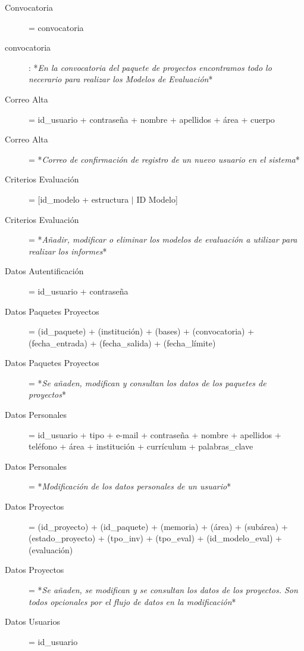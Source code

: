 \documentclass[12pt,a4paper,titlepage,spanish,twoside]{book}
\begin{document}
\begin{description}
\item[Convocatoria] = convocatoria

\item[convocatoria]: *\emph{En la convocatoria del paquete de proyectos
    encontramos todo lo necerario para realizar los Modelos de Evaluación}* 

\item[Correo Alta] = id\_usuario + contraseña + nombre + apellidos + área +
  cuerpo 

\item[Correo Alta] = *\emph{Correo de confirmación de registro de un nuevo
    usuario en el sistema}* 

\item[Criterios Evaluación] = [id\_modelo + estructura $\mid$ ID Modelo]

\item[Criterios Evaluación] = *\emph{Añadir, modificar o eliminar los modelos
    de e\-va\-lua\-ción a utilizar para realizar los informes}* 

\item[Datos Autentificación] = id\_usuario + contraseña

\item[Datos Paquetes Proyectos] = (id\_paquete) + (institución) + (bases) +
  (convocatoria) + (fecha\_entrada) + (fecha\_salida) + (fecha\_límite) 

\item[Datos Paquetes Proyectos] = *\emph{Se añaden, modifican y consultan los
    datos de los paquetes de proyectos}* 

\item[Datos Personales] = id\_usuario + tipo + e-mail + contraseña + nombre +
  apellidos + teléfono + área + institución + currículum + palabras\_clave 

\item[Datos Personales] = *\emph{Modificación de los datos personales de un
    usuario}* 

\item[Datos Proyectos] = (id\_proyecto) + (id\_paquete) + (memoria) + (área)
  + (subárea) + (estado\_proyecto) + (tpo\_inv) + (tpo\_eval) +
  (id\_modelo\_eval) + (evaluación) 

\item[Datos Proyectos] = *\emph{Se añaden, se modifican y se consultan los
    datos de los proyectos. Son todos opcionales por el flujo de datos en la
    modificación}* 

\item[Datos Usuarios] = id\_usuario


\end{description}
\end{document}
